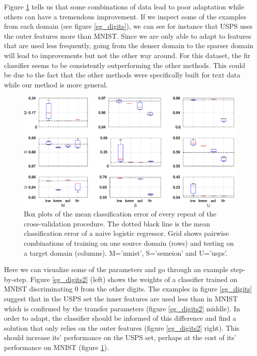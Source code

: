 \documentclass[twoside,11pt]{article}
\begin{document}
Figure \ref{err_digits} tells us that some combinations of data lead to poor adaptation while others can have a tremendous improvement. If we inspect some of the examples from each domain (see figure \ref{eg_digits}), we can see for instance that USPS uses the outer features more than MNIST. Since we are only able to adapt to features that are used less frequently, going from the denser domain to the sparser domain will lead to improvements but not the other way around. For this dataset, the {\sc fir} classifier seems to be consistently outperforming the other methods. This could be due to the fact that the other methods were specifically built for text data while our method is more general.

\begin{figure}[ht]
	\centering
	\includegraphics[width=.9\textwidth]{images/err_digits_box.eps}
	\caption{Box plots of the mean classification error of every repeat of the cross-validation procedure. The dotted black line is the mean classification error of a naive logistic regressor. Grid shows pairwise combinations of training on one source domain (rows) and testing on a target domain (columns). M='mnist', S='semeion' and U='usps'.}
	\label{err_digits}
\end{figure}

Here we can visualize some of the parameters and go through an example step-by-step. Figure \ref{eg_digits2} (left) shows the weights of a classifier trained on MNIST discriminating $0$ from the other digits. The examples in figure \ref{eg_digits} suggest that in the USPS set the inner features are used less than in MNIST which is confirmed by the transfer parameters (figure \ref{eg_digits2} middle). In order to adapt, the classifier should be informed of this difference and find a solution that only relies on the outer features (figure \ref{eg_digits2} right). This should increase its' performance on the USPS set, perhaps at the cost of its' performance on MNIST (figure \ref{err_digits}).
\end{document}
